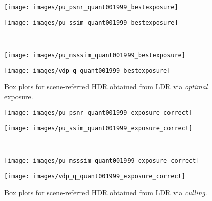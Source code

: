 \documentclass{egpubl}
\begin{document}
\begin{figure}[t]
    \centering
    \begin{minipage}{0.48\linewidth}
        \centering
        \texttt{[image: images/pu\_psnr\_quant001999\_bestexposure]}
    \end{minipage}
    \begin{minipage}{0.48\linewidth}
        \centering
        \texttt{[image: images/pu\_ssim\_quant001999\_bestexposure]}
    \end{minipage}\\
    \begin{minipage}{0.48\linewidth}
        \centering
        \texttt{[image: images/pu\_msssim\_quant001999\_bestexposure]}
    \end{minipage}
    \begin{minipage}{0.48\linewidth}
        \centering
        \texttt{[image: images/vdp\_q\_quant001999\_bestexposure]}
    \end{minipage}
    \caption{Box plots for scene-referred HDR obtained from LDR via
    \textit{optimal} exposure.}\label{fig:boxplots_scene_optimal}
\end{figure}
\begin{figure}[t]
\centering
    \begin{minipage}{0.48\linewidth}
        \centering
\texttt{[image: images/pu\_psnr\_quant001999\_exposure\_correct]}
    \end{minipage}
    \begin{minipage}{0.48\linewidth}
        \centering
\texttt{[image: images/pu\_ssim\_quant001999\_exposure\_correct]}
    \end{minipage}\\
    \begin{minipage}{0.48\linewidth}
        \centering
\texttt{[image: images/pu\_msssim\_quant001999\_exposure\_correct]}
    \end{minipage}
    \begin{minipage}{0.48\linewidth}
        \centering
\texttt{[image: images/vdp\_q\_quant001999\_exposure\_correct]}
    \end{minipage}
    \caption{Box plots for scene-referred HDR obtained from LDR via
    \textit{culling}.}\label{fig:boxplots_scene_culling}
\end{figure}
\end{document}
